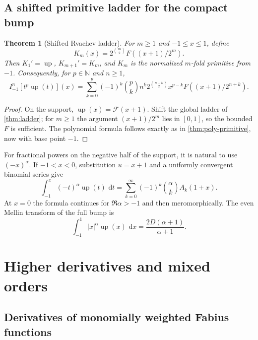 \documentclass[11pt,oneside]{article}
\numberwithin{equation}{section}
\newtheorem{theorem}{Theorem}[section]
\theoremstyle{definition}
\theoremstyle{remark}
\newcommand{\N}{\mathbb N}
\newcommand{\Up}{\operatorname{up}}
\newcommand{\dd}{\,\mathrm d}
\newcommand{\rise}[2]{#1^{\overline{#2}}}
\begin{document}
\subsection{A shifted primitive ladder for the compact bump}

\begin{theorem}[Shifted Rvachev ladder]
\label{thm:up-ladder}
For $m\ge1$ and $-1\le x\le1$, define
\begin{equation}
 K_m(x)=2^{\binom m2}F((x+1)/2^m).                            \label{eq:Km}
\end{equation}
Then $K_1'=\Up$, $K_{m+1}'=K_m$, and $K_m$ is the normalized $m$-fold primitive from $-1$.
Consequently, for $p\in\N$ and $n\ge1$,
\begin{equation}
 \boxed{
 I_{-1}^n[t^p\Up(t)](x)
 =\sum_{k=0}^{p}(-1)^k\binom pk\rise nk
 2^{\binom{n+k}{2}}x^{p-k}F((x+1)/2^{n+k}).}
 \label{eq:up-monomial}
\end{equation}
\end{theorem}

\begin{proof}
On the support, $\Up(x)=\mathcal F(x+1)$.  Shift the global ladder of
\cref{thm:ladder}; for $m\ge1$ the argument $(x+1)/2^m$ lies in $[0,1]$, so the bounded $F$
is sufficient.  The polynomial formula follows exactly as in \cref{thm:poly-primitive}, now
with base point $-1$.
\end{proof}

For fractional powers on the negative half of the support, it is natural to use $(-x)^\alpha$.
If $-1<x<0$, substitution $u=x+1$ and a uniformly convergent binomial series give
\begin{equation}
 \boxed{
 \int_{-1}^{x}(-t)^\alpha\Up(t)\,\dd t
 =\sum_{k=0}^{\infty}(-1)^k\binom\alpha k A_k(1+x).}
 \label{eq:up-negative-half-fractional}
\end{equation}
At $x=0$ the formula continues for $\Re\alpha>-1$ and then meromorphically.  The even Mellin
transform of the full bump is
\begin{equation}
 \int_{-1}^1|x|^\alpha\Up(x)\,\dd x
 =\frac{2D(\alpha+1)}{\alpha+1}.                             \label{eq:up-even-Mellin}
\end{equation}

\section{Higher derivatives and mixed orders}
\label{sec:derivatives}

\subsection{Derivatives of monomially weighted Fabius functions}
\end{document}
